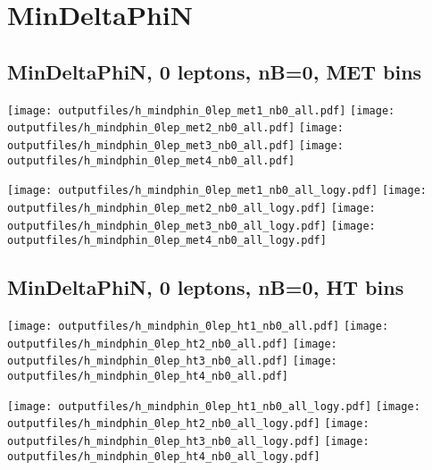 \documentclass[11pt]{article}
\begin{document}
    \clearpage






    \section{ MinDeltaPhiN }

    \subsection{ MinDeltaPhiN, 0 leptons, nB=0, MET bins }

    \noindent
     \texttt{[image: outputfiles/h\_mindphin\_0lep\_met1\_nb0\_all.pdf]}
     \texttt{[image: outputfiles/h\_mindphin\_0lep\_met2\_nb0\_all.pdf]}
     \texttt{[image: outputfiles/h\_mindphin\_0lep\_met3\_nb0\_all.pdf]}
     \texttt{[image: outputfiles/h\_mindphin\_0lep\_met4\_nb0\_all.pdf]}

    \noindent
     \texttt{[image: outputfiles/h\_mindphin\_0lep\_met1\_nb0\_all\_logy.pdf]}
     \texttt{[image: outputfiles/h\_mindphin\_0lep\_met2\_nb0\_all\_logy.pdf]}
     \texttt{[image: outputfiles/h\_mindphin\_0lep\_met3\_nb0\_all\_logy.pdf]}
     \texttt{[image: outputfiles/h\_mindphin\_0lep\_met4\_nb0\_all\_logy.pdf]}

    \clearpage



    \subsection{ MinDeltaPhiN, 0 leptons, nB=0, HT bins }

    \noindent
     \texttt{[image: outputfiles/h\_mindphin\_0lep\_ht1\_nb0\_all.pdf]}
     \texttt{[image: outputfiles/h\_mindphin\_0lep\_ht2\_nb0\_all.pdf]}
     \texttt{[image: outputfiles/h\_mindphin\_0lep\_ht3\_nb0\_all.pdf]}
     \texttt{[image: outputfiles/h\_mindphin\_0lep\_ht4\_nb0\_all.pdf]}

    \noindent
     \texttt{[image: outputfiles/h\_mindphin\_0lep\_ht1\_nb0\_all\_logy.pdf]}
     \texttt{[image: outputfiles/h\_mindphin\_0lep\_ht2\_nb0\_all\_logy.pdf]}
     \texttt{[image: outputfiles/h\_mindphin\_0lep\_ht3\_nb0\_all\_logy.pdf]}
     \texttt{[image: outputfiles/h\_mindphin\_0lep\_ht4\_nb0\_all\_logy.pdf]}
\end{document}
